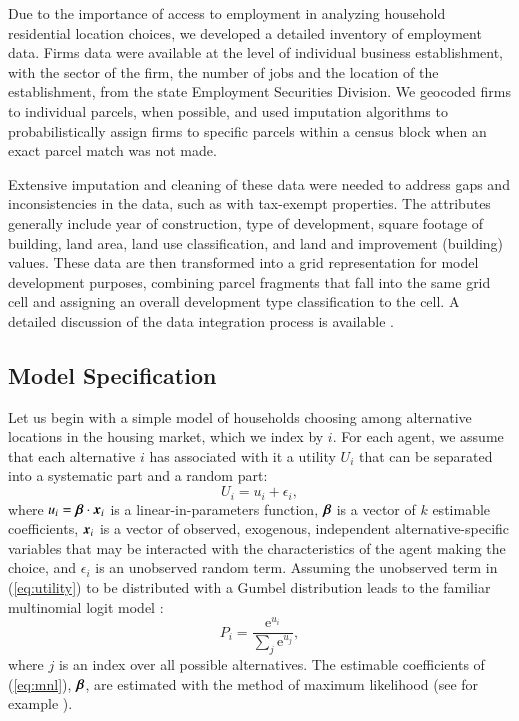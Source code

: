 \documentclass[12pt,a4paper]{article}
\newcommand{\vk}[1]{\mbox{\boldmath $#1$}}
\begin{document}
Due to the importance of access to employment in analyzing household
residential location choices, we developed a detailed inventory of
employment data.  Firms data were available at the level of
individual business establishment, with the sector of the firm, the
number of jobs and the location of the establishment, from the state
Employment Securities Division. We geocoded firms to individual
parcels, when possible, and used imputation algorithms to
probabilistically assign firms to specific parcels within a census
block when an exact parcel match was not made.

Extensive imputation and cleaning of these data were needed to
address gaps and inconsistencies in the data, such as with
tax-exempt properties. The attributes generally include year of
construction, type of development, square footage of building, land
area, land use classification, and land and improvement (building)
values.  These data are then transformed into a grid representation
for model development purposes, combining parcel fragments that fall
into the same grid cell and assigning an overall development type
classification to the cell.  A detailed discussion of the data
integration process is available \cite{waddell-cuspa-2004}.

\subsection{Model Specification}

Let us begin with a simple model of households choosing among
alternative locations in the housing market, which we index by
$i$. For each agent, we assume that each alternative $i$ has
associated with it a utility $U_i$ that can be separated into a
systematic part and a random part:
\begin{equation}
    U_i = u_i + \epsilon_i,
    \label{eq:utility}
\end{equation}
where $u_i = \vk{\beta}\cdot\vk{x}_i$ is a linear-in-parameters
function, $\vk{\beta}$ is a vector of $k$ estimable coefficients,
$\vk{x}_i$ is a vector of observed, exogenous, independent
alternative-specific variables that may be interacted with the
characteristics of the agent making the choice, and $\epsilon_i$
is an unobserved random term. Assuming the unobserved term in
(\ref{eq:utility}) to be distributed with a Gumbel distribution
leads to the familiar multinomial logit model
\cite{mcfadden-1974,mcfadden-1981}:
\begin{equation}
    P_i = \frac{\mathrm{e}^{u_i}}{\sum_j \mathrm{e}^{u_j}},
    \label{eq:mnl}
\end{equation}
where $j$ is an index over all possible alternatives. The
estimable coefficients of (\ref{eq:mnl}), $\vk{\beta}$, are
estimated with the method of maximum likelihood (see for example
\cite{Greene-2002}).
\end{document}
